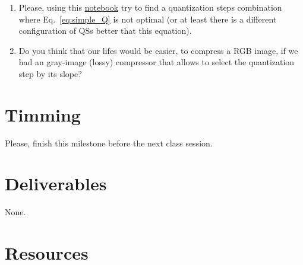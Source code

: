 \begin{enumerate}
\item Please, using this
  \href{https://github.com/Sistemas-Multimedia/Sistemas-Multimedia.github.io/blob/master/milestones/05-RGB_compression/RGB_compression.ipynb}{notebook}
  try to find a quantization steps combination where
  Eq.~\ref{eq:simple_Q} is not optimal (or at least there is a
  different configuration of QSs better that this equation).
\item Do you think that our lifes would be easier, to compress a RGB
  image, if we had an gray-image (lossy) compressor that allows to
  select the quantization step by its slope?
\end{enumerate}


\section{Timming}

Please, finish this milestone before the next class session.

\section{Deliverables}

None.

\section{Resources}

\renewcommand{\addcontentsline}[3]{} %

